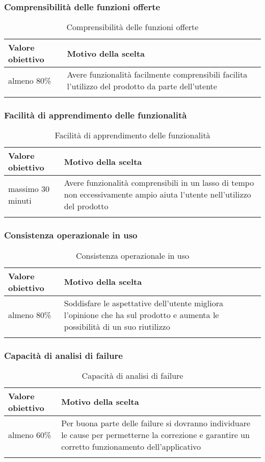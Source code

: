 \documentclass[../PianoDiQualifica_v4.0.0.tex]{subfiles}
\begin{document}
		\subsubsection{Comprensibilità delle funzioni offerte}
			\begin{longtable}[c] { >{\centering\arraybackslash}p{4cm} p{7cm} }
				\toprule
				\centerline{\textbf{Valore obiettivo}} & \centerline{\textbf{Motivo della scelta}} \\
				\midrule
					almeno 80\% & Avere funzionalità facilmente comprensibili facilita l'utilizzo del prodotto da parte dell'utente \\
				\bottomrule
				\caption{Comprensibilità delle funzioni offerte}
			\end{longtable}

		\subsubsection{Facilità di apprendimento delle funzionalità}
			\begin{longtable}[c] { >{\centering\arraybackslash}p{4cm} p{7cm} }
				\toprule
				\centerline{\textbf{Valore obiettivo}} & \centerline{\textbf{Motivo della scelta}} \\
				\midrule
					massimo 30 minuti & Avere funzionalità comprensibili in un lasso di tempo non eccessivamente ampio aiuta l'utente nell'utilizzo del prodotto \\
				\bottomrule
				\caption{Facilità di apprendimento delle funzionalità}
			\end{longtable}

		\subsubsection{Consistenza operazionale in uso}
			\begin{longtable}[c] { >{\centering\arraybackslash}p{4cm} p{7cm} }
				\toprule
				\centerline{\textbf{Valore obiettivo}} & \centerline{\textbf{Motivo della scelta}} \\
				\midrule
					almeno 80\% & Soddisfare le aspettative dell'utente migliora l'opinione che ha sul prodotto e aumenta le possibilità di un suo riutilizzo  \\
				\bottomrule
				\caption{Consistenza operazionale in uso}
			\end{longtable}

		\subsubsection{Capacità di analisi di failure}
			\begin{longtable}[c] { >{\centering\arraybackslash}p{4cm} p{7cm} }
				\toprule
				\centerline{\textbf{Valore obiettivo}} & \centerline{\textbf{Motivo della scelta}} \\
				\midrule
					almeno 60\% & Per buona parte delle failure si dovranno individuare le cause per permetterne la correzione e garantire un corretto funzionamento dell'applicativo  \\
				\bottomrule
				\caption{Capacità di analisi di failure}
			\end{longtable}
\end{document}
